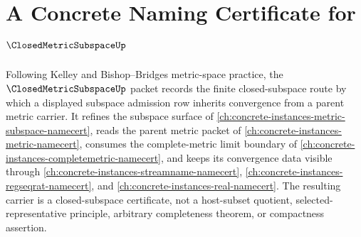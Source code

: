 \chapter{A Concrete Naming Certificate for $\ClosedMetricSubspaceUp$}
\label{ch:concrete-instances-closed-metric-subspace-namecert}

Following Kelley and Bishop--Bridges metric-space practice, the $\ClosedMetricSubspaceUp$ packet records the finite closed-subspace route by which a displayed subspace admission row inherits convergence from a parent metric carrier. It refines the subspace surface of \autoref{ch:concrete-instances-metric-subspace-namecert}, reads the parent metric packet of \autoref{ch:concrete-instances-metric-namecert}, consumes the complete-metric limit boundary of \autoref{ch:concrete-instances-completemetric-namecert}, and keeps its convergence data visible through \autoref{ch:concrete-instances-streamname-namecert}, \autoref{ch:concrete-instances-regseqrat-namecert}, and \autoref{ch:concrete-instances-real-namecert}. The resulting carrier is a closed-subspace certificate, not a host-subset quotient, selected-representative principle, arbitrary completeness theorem, or compactness assertion.

